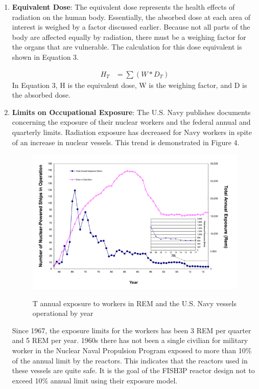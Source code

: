\documentclass[12pt]{article}
\begin{document}
\begin{enumerate}
\item \textbf{Equivalent Dose}: \newline
The equivalent dose represents the health effects of radiation on the human body.  Essentially, 
the absorbed dose at each area of interest is weighed by a factor discussed earlier.  Because not all parts of the body are affected equally by radiation, there must be a weighing factor for the organs that are vulnerable.  The calculation for this dose equivalent is shown in Equation 3.

\begin{align}
H_T &= \sum (W*D_T) 
\end{align}
In Equation 3, H is the equivalent dose, W is the weighing factor, and D is the absorbed dose.

\item \textbf{Limits on Occupational Exposure}: \newline
The U.S. Navy publishes documents concerning the exposure of their nuclear workers and the federal annual and quarterly limits.  Radiation exposure has decreased for Navy workers in spite of an increase in nuclear vessels.  This trend is demonstrated in Figure 4.

\begin{figure}[H]                                  
    \centering                                     
    \includegraphics[width=1\textwidth]{exposure-navy}   
    \caption{T annual exposure to workers in REM and the U.S. Navy vessels operational by year}
    \label{fig:mesh1}     \cite{navy_exposure}
\end{figure}       

Since 1967, the exposure limits for the workers has been 3 REM per quarter and 5 REM per year.  1960s there has not been a single civilian for military worker in the Nuclear Naval Propulsion Program exposed to more than 10\% of the annual limit by the reactors.  This indicates that the reactors used in these vessels are quite safe.  It is the goal of the FISH3P reactor design not to exceed 10\% annual limit using their exposure model.  

\end{enumerate}
\end{document}
